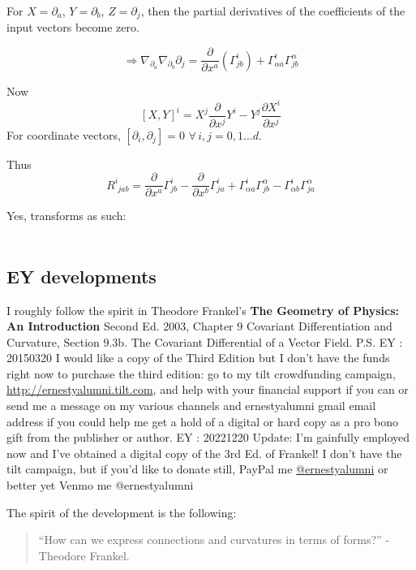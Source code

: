 	For $X = \partial_a$, $Y = \partial_b$, $Z=\partial_j$, then the partial derivatives of the coefficients of the input vectors become zero.  
	
	\[
	\Longrightarrow \nabla_{ \partial_a} \nabla_{\partial_b} \partial_j = \frac{ \partial }{ \partial x^a} (\Gamma^i_{ jb} ) + \Gamma^i_{\alpha a} \Gamma^{\alpha}_{jb}
	\]
	
	Now
	\[
	[X,Y]^i = X^j \frac{ \partial }{ \partial x^j} Y^i - Y^j \frac{ \partial X^i}{ \partial x^j}
	\]
	For coordinate vectors, $[\partial_i, \partial_j] = 0$ $\forall \, i,j = 0, 1 \dots d$.  
	
	Thus
	\[
	\boxed{ R^i_{ \, \, jab} = \frac{ \partial }{ \partial x^a} \Gamma^i_{jb} - \frac{ \partial }{ \partial x^b} \Gamma^i_{ja} + \Gamma^i_{\alpha a} \Gamma^{\alpha}_{jb} -\Gamma^i_{\alpha b} \Gamma^{\alpha}_{ja} }
	\]
	
	
	
	Yes, transforms as such:
	
	\[
	\begin{gathered}
	\end{gathered}
	\]
	
	\subsection*{EY developments}
	
	I roughly follow the spirit in Theodore Frankel's \textbf{The Geometry of Physics: An Introduction} Second Ed. 2003, Chapter 9 Covariant Differentiation and Curvature, Section 9.3b. The Covariant Differential of a Vector Field. P.S. EY : 20150320 I would like a copy of the Third Edition but I don't have the funds right now to purchase the third edition: go to my tilt crowdfunding campaign, \url{http://ernestyalumni.tilt.com}, and help with your financial support if you can or send me a message on my various channels and ernestyalumni gmail email address if you could help me get a hold of a digital or hard copy as a pro bono gift from the publisher or author.  EY : 20221220 Update: I'm gainfully employed now and I've obtained a digital copy of the 3rd Ed. of Frankel! I don't have the tilt campaign, but if you'd like to donate still, PayPal me \href{mailto:ernestyalumni@gmail.com}{@ernestyalumni} or better yet Venmo me @ernestyalumni
	
	The spirit of the development is the following:
	\begin{quote}
		``How can we express connections and curvatures in terms of forms?'' -Theodore Frankel.  
	\end{quote}
	
